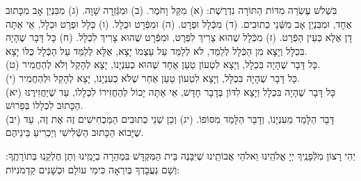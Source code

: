 בִּשְׁלֹשׁ עֶשְׂרֵה מִדּוֹת הַתּוֹרָה נִדְרֶשֶׁת:\hfill \break
(א) מִקַּל וָחֹמֶר.\hfill \break
(ב) וּמִגְּֿזֵרָה שָׁוָה.\hfill \break
(ג) מִבִּנְיַן אָב מִכָּתוּב אֶחָד, וּמִבִּנְיַן אָב מִשְּֿׁנֵי כְתוּבִים.\hfill \break
(ד) מִכְּֿלָל וּפְרָט.\hfill \break
(ה) וּמִפְּֿרָט וּכְלָל.\hfill \break
(ו) כְּלָל וּפְרָט וּכְלָל, אֵי אַתָּה דָן אֶלָּא כְּעֵין הַפְּֿרָט.\hfill \break
(ז) מִכְּֿלָל שֶׁהוּא צָרִיךְ לִפְרָט, וּמִפְּֿרָט שֶׁהוּא צָרִיךְ לִכְלָל.\hfill \break
(ח) כָּל דָּבָר שֶׁהָיָה בִּכְלָל וְיָצָא מִן הַכְּֿלָל לְלַמֵּד, לֹא לְלַמֵּד עַל עַצְמוֹ יָצָא, אֶלָּא לְלַמֵּד עַל הַכְּֿלָל כֻּלּוֹ יָצָא. \\
(ט) כָּל דָּבָר שֶׁהָיָה בִּכְלָל, וְיָצָא לִטְעוֹן טַעַן אֶחָד שֶׁהוּא כְעִנְיָנוֹ, יָצָא לְהָקֵל וְלֹא לְהַחֲמִיר. \\
(י) כָּל דָּבָר שֶׁהָיָה בִּכְלָל, וְיָצָא לִטְעוֹן טַעַן אַחֵר שֶׁלֹּא כְעִנְיָנוֹ, יָצָא לְהָקֵל וּלְהַחֲמִיר. \\
(יא) כָּל דָּבָר שֶׁהָיָה בִּכְלָל וְיָצָא לִדּוֹן בְּדָבָר חָדָשׁ, אֵי אַתָּה יָכוֹל לְהַחֲזִירוֹ לִכְלָלוֹ, עַד שֶׁיַּחֲזִירֶנּוּ הַכָּתוּב לִכְלָלוֹ בְּפֵרוּשׁ. \\
(יב) דָּבָר הַלָּמֵד מֵעִנְיָנוֹ, וְדָבָר הַלָּמֵד מִסּוֹפוֹ.\hfill \break
(יג) וְכֵן שְׁנֵי כְתוּבִים הַמַּכְחִישִׁים זֶה אֶת זֶה, עַד שֶׁיָּבוֹא הַכָּתוּב הַשְּֿׁלִישִׁי וְיַכְרִיעַ בֵּינֵיהֶם. 

יְהִי רָצוֹן מִלְּֿפָנֶֽיךָ יְיָ אֱלֹהֵֽינוּ וֵאלֹהֵי אֲבוֹתֵֽינוּ שֶׁיִּבָּנֶה בֵּית הַמִּקְדָּשׁ בִּמְהֵרָה בְיָמֵֽינוּ וְתֵן חֶלְקֵֽנוּ בְּתוֹרָתֶֽךָ: וְשָׁם נַעֲבָדְךָ בְּיִרְאָה כִּימֵי עוֹלָם וּכְשָׁנִים קַדְמֹנִיּוֹת:
